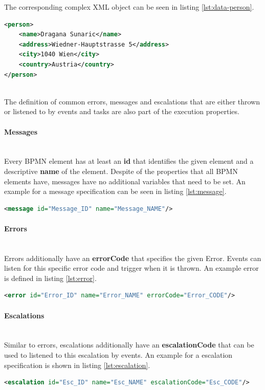 The corresponding complex XML object can be seen in listing \ref{lst:data-person}. 
\begin{lstlisting}[language=xml,caption={An instance of the complex type 'person'},captionpos=b,label={lst:data-person}]
<person>
	<name>Dragana Sunaric</name>
	<address>Wiedner-Hauptstrasse 5</address>
	<city>1040 Wien</city>
	<country>Austria</country>
</person>
\end{lstlisting}


~\\The definition of common errors, messages and escalations that are either thrown or listened to by events and tasks are also part of the execution properties. 
\paragraph{Messages}~\\
Every BPMN element has at least an \textbf{id} that identifies the given element and a descriptive \textbf{name} of the element.\cite{bpmnstandard} Despite of the properties that all BPMN elements have, messages have no additional variables that need to be set. An example for a message specification can be seen in listing \ref{lst:message}.
	\begin{lstlisting}[language=xml,caption={Example for a message definition},captionpos=b,label={lst:message}]
<message id="Message_ID" name="Message_NAME"/>
	\end{lstlisting}
\paragraph{Errors}~\\
Errors additionally have an \textbf{errorCode} that specifies the given Error. Events can listen for this specific error code and trigger when it is thrown. An example error is defined in listing \ref{lst:error}.\\ 
	\begin{lstlisting}[language=xml,caption={Example for a error definition},captionpos=b,label={lst:error}]
<error id="Error_ID" name="Error_NAME" errorCode="Error_CODE"/>
	\end{lstlisting}
\paragraph{Escalations}~\\
Similar to errors, escalations additionally have an \textbf{escalationCode} that can be used to listened to this escalation by events. An example for a escalation specification is shown in listing \ref{lst:escalation}.\\
	\begin{lstlisting}[language=xml,caption={Example for a escalation definition},captionpos=b,label={lst:escalation}]
<escalation id="Esc_ID" name="Esc_NAME" escalationCode="Esc_CODE"/>
\end{lstlisting}

